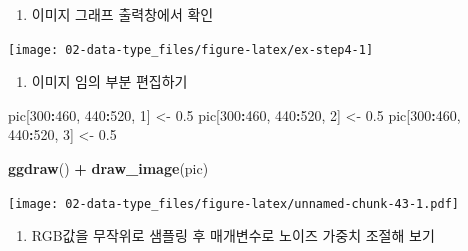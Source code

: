 \documentclass[
  11pt,
]{krantz}
\newenvironment{Shaded}{\begin{snugshade}}{\end{snugshade}}
\newcommand{\DecValTok}[1]{\textcolor[rgb]{0.06,0.06,0.06}{#1}}
\newcommand{\FloatTok}[1]{\textcolor[rgb]{0.06,0.06,0.06}{#1}}
\newcommand{\KeywordTok}[1]{\textcolor[rgb]{0.27,0.27,0.27}{\textbf{#1}}}
\newcommand{\NormalTok}[1]{#1}
\newcommand{\OperatorTok}[1]{\textcolor[rgb]{0.43,0.43,0.43}{\textbf{#1}}}
\newcommand{\StringTok}[1]{\textcolor[rgb]{0.5,0.5,0.5}{#1}}
\providecommand{\tightlist}{%
  \setlength{\itemsep}{0pt}\setlength{\parskip}{0pt}}
\begin{document}
\normalsize

\begin{enumerate}
\def\labelenumi{\arabic{enumi}.}
\setcounter{enumi}{3}
\tightlist
\item
  이미지 그래프 출력창에서 확인
\end{enumerate}

\footnotesize

\begin{center}\texttt{[image: 02-data-type\_files/figure-latex/ex-step4-1]} \end{center}

\normalsize

\begin{enumerate}
\def\labelenumi{\arabic{enumi}.}
\setcounter{enumi}{4}
\tightlist
\item
  이미지 임의 부분 편집하기
\end{enumerate}

\footnotesize

\begin{Shaded}
\begin{Highlighting}[]
\NormalTok{pic[}\DecValTok{300}\OperatorTok{:}\DecValTok{460}\NormalTok{, }\DecValTok{440}\OperatorTok{:}\DecValTok{520}\NormalTok{, }\DecValTok{1}\NormalTok{] <-}\StringTok{ }\FloatTok{0.5}
\NormalTok{pic[}\DecValTok{300}\OperatorTok{:}\DecValTok{460}\NormalTok{, }\DecValTok{440}\OperatorTok{:}\DecValTok{520}\NormalTok{, }\DecValTok{2}\NormalTok{] <-}\StringTok{ }\FloatTok{0.5}
\NormalTok{pic[}\DecValTok{300}\OperatorTok{:}\DecValTok{460}\NormalTok{, }\DecValTok{440}\OperatorTok{:}\DecValTok{520}\NormalTok{, }\DecValTok{3}\NormalTok{] <-}\StringTok{ }\FloatTok{0.5}

\KeywordTok{ggdraw}\NormalTok{() }\OperatorTok{+}
\StringTok{  }\KeywordTok{draw_image}\NormalTok{(pic)}
\end{Highlighting}
\end{Shaded}

\texttt{[image: 02-data-type\_files/figure-latex/unnamed-chunk-43-1.pdf]}

\normalsize

\begin{enumerate}
\def\labelenumi{\arabic{enumi}.}
\setcounter{enumi}{5}
\tightlist
\item
  RGB값을 무작위로 샘플링 후 매개변수로 노이즈 가중치 조절해 보기
\end{enumerate}

\footnotesize
\end{document}
